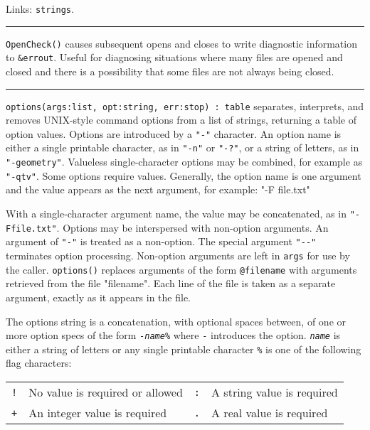 Links: \texttt{strings}.

\vspace{0.25cm}\hrule{}

\texttt{OpenCheck()} causes subsequent opens and closes to write
diagnostic information to \texttt{\&errout}. Useful for diagnosing
situations where many files are opened and closed and there is a
possibility that some files are not always being closed.

\vspace{0.25cm}\hrule{}

\texttt{options(args:list, opt:string, err:stop) : table} separates,
interprets, and removes UNIX-style command
options from a list of strings,
returning a table of option values. Options are
introduced by a \texttt{"-"} character. An
option name is either a single printable character, as in
\texttt{"-n"} or
\texttt{"-?"}, or a string of letters, as
in \texttt{"-geometry"}. Valueless
single-character options may be combined, for example as
\texttt{"-qtv"}. Some options require
values. Generally, the option name is one argument and the value
appears as the next argument, for example: {\ttfamily "-F file.txt"}

\noindent With a single-character argument name,
the value may be concatenated, as in
\texttt{"-Ffile.txt"}.
Options may be interspersed with non-option
arguments. An argument of \texttt{"-"} is
treated as a non-option. The special argument
\texttt{"-{}-"} terminates option
processing. Non-option arguments are left in \texttt{args}
for use by the caller. \texttt{options()} replaces arguments of the form
\texttt{@filename} with arguments retrieved from the file
"filename". Each line of the file is taken
as a separate argument, exactly as it appears in the file.

The options string is a concatenation, with optional spaces between, of
one or more option specs of the form
\texttt{{}-}\texttt{\textit{name}}\texttt{\%} where \texttt{{}-}
introduces the option.
\texttt{\textit{name}} is either a string of letters or any single
printable character
\texttt{\%} is one of the following flag characters:

\begin{tabular}{m{0.15in}m{2.85in}m{0.15in}m{2.85in}}
\texttt{!} & No value is required or allowed &
\texttt{:} & A string value is required\\
\texttt{+} & An integer value is required &
\texttt{.} & A real value is required
\end{tabular}

